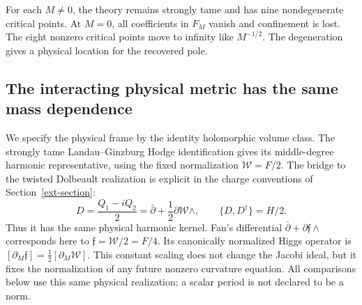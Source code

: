 For each $M\ne0$, the theory remains strongly tame and has nine nondegenerate critical points. At $M=0$, all coefficients in $F_M$ vanish and confinement is lost. The eight nonzero critical points move to infinity like $M^{-1/2}$. The degeneration gives a physical location for the recovered pole.

\subsection{The interacting physical metric has the same mass dependence}
We specify the physical frame by the identity holomorphic volume class. The strongly tame Landau--Ginzburg Hodge identification gives its middle-degree harmonic representative, using the fixed normalization $\mathcal W=F/2$. The bridge to the twisted Dolbeault realization is explicit in the charge conventions of Section~\ref{ext-section}:
\begin{equation}\label{qua:dolbeault-convention}
D=\frac{Q_1-iQ_2}{2}=\bar\partial+\frac12\partial\mathcal W\wedge,
\qquad \{D,D^\dagger\}=H/2.
\end{equation}
Thus it has the same physical harmonic kernel. Fan's differential $\bar\partial+\partial\mathfrak f\wedge$ corresponds here to $\mathfrak f=\mathcal W/2=F/4$. Its canonically normalized Higgs operator is $[\partial_M\mathfrak f]=\tfrac12[\partial_M\mathcal W]$. This constant scaling does not change the Jacobi ideal, but it fixes the normalization of any future nonzero curvature equation. All comparisons below use this same physical realization; a scalar period is not declared to be a norm.


